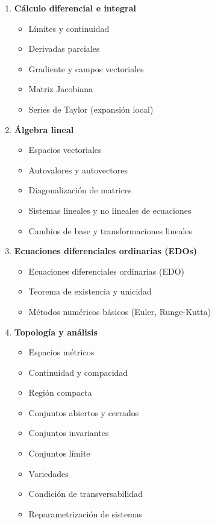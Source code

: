     \begin{enumerate}
    	\item \textbf{Cálculo diferencial e integral}
    	\begin{itemize}
    		\item Límites y continuidad
    		\item Derivadas parciales
    		\item Gradiente y campos vectoriales
    		\item Matriz Jacobiana
    		\item Series de Taylor (expansión local)
    	\end{itemize}
    	
    	\item \textbf{Álgebra lineal}
    	\begin{itemize}
    		\item Espacios vectoriales
    		\item Autovalores y autovectores \checkmark
    		\item Diagonalización de matrices \checkmark
    		\item Sistemas lineales y no lineales de ecuaciones \checkmark
    		\item Cambios de base y transformaciones lineales
    	\end{itemize}
    	
    	\item \textbf{Ecuaciones diferenciales ordinarias (EDOs)}
    	\begin{itemize}
    		\item Ecuaciones diferenciales ordinarias (EDO) \checkmark
    		\item Teorema de existencia y unicidad \checkmark
    		\item Métodos numéricos básicos (Euler, Runge-Kutta)
    	\end{itemize}
    	
    	\item \textbf{Topología y análisis}
    	\begin{itemize}
    		\item Espacios métricos
    		\item Continuidad y compacidad
    		\item Región compacta
    		\item Conjuntos abiertos y cerrados
    		\item Conjuntos invariantes
    		\item Conjuntos límite
    		\item Variedades
    		\item Condición de transversabilidad
    		\item Reparametrización de sistemas
    	\end{itemize}
    	

\end{enumerate}
